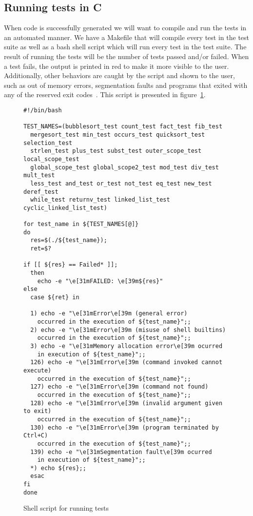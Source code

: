 \subsection{Running tests in C}

When code is successfully generated we will want to compile and run the tests in an automated manner.
We have a Makefile that will compile every test in the test suite as well as a bash shell script which will run every test in the test suite.
The result of running the tests will be the number of tests passed and/or failed.
When a test fails, the output is printed in red to make it more visible to the user.
Additionally, other behaviors are caught by the script and shown to the user, such as out of memory errors, segmentation faults and programs that exited with any of the reserved exit codes~\parencite{bash-scripting}.
This script is presented in figure~\ref{fig:bash_script}.

\begin{figure}
\begin{lstlisting}
#!/bin/bash

TEST_NAMES=(bubblesort_test count_test fact_test fib_test
  mergesort_test min_test occurs_test quicksort_test selection_test
  strlen_test plus_test subst_test outer_scope_test local_scope_test
  global_scope_test global_scope2_test mod_test div_test mult_test
  less_test and_test or_test not_test eq_test new_test deref_test
  while_test returnv_test linked_list_test cyclic_linked_list_test)

for test_name in ${TEST_NAMES[@]}
do
  res=$(./${test_name});
  ret=$?

if [[ ${res} == Failed* ]];
  then
    echo -e "\e[31mFAILED: \e[39m${res}"
else
  case ${ret} in

  1) echo -e "\e[31mError\e[39m (general error)
    occurred in the execution of ${test_name}";;
  2) echo -e "\e[31mError\e[39m (misuse of shell builtins)
    occurred in the execution of ${test_name}";;
  3) echo -e "\e[31mMemory allocation error\e[39m ocurred
    in execution of ${test_name}";;
  126) echo -e "\e[31mError\e[39m (command invoked cannot execute)
    occurred in the execution of ${test_name}";;
  127) echo -e "\e[31mError\e[39m (command not found)
    occurred in the execution of ${test_name}";;
  128) echo -e "\e[31mError\e[39m (invalid argument given to exit)
    occurred in the execution of ${test_name}";;
  130) echo -e "\e[31mError\e[39m (program terminated by Ctrl+C)
    occurred in the execution of ${test_name}";;
  139) echo -e "\e[31mSegmentation fault\e[39m ocurred
    in execution of ${test_name}";;
  *) echo ${res};;
  esac
fi
done
\end{lstlisting}

\caption{Shell script for running tests}
\label{fig:bash_script}
\end{figure}

